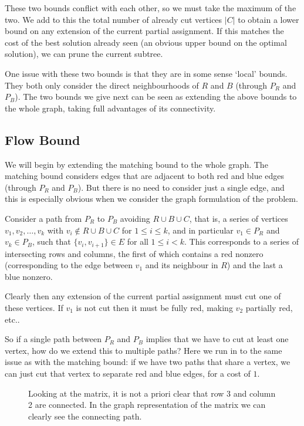 	These two bounds conflict with each other, so we must take the maximum of
	the two. We add to this the total number of already cut vertices $|C|$ to
	obtain a lower bound on any extension of the current partial assignment.
	If this matches the cost of the best solution already seen (an obvious
	upper bound on the optimal solution), we can prune the current subtree.

	One issue with these two bounds is that they are in some sense `local'
	bounds. They both only consider the direct neighbourhoods of $R$ and $B$
	(through $P_R$ and $P_B$). The two bounds we give next can be seen as
	extending the above bounds to the whole graph, taking full advantages of
	its connectivity.

	\subsection{Flow Bound}

	We will begin by extending the matching bound to the whole graph. The
	matching bound considers edges that are adjacent to both red and blue
	edges (through $P_R$ and $P_B$). But there is no need to consider just
	a single edge, and this is especially obvious when we consider the graph
	formulation of the problem.

	Consider a path from $P_R$ to $P_B$ avoiding $R \cup B \cup C$, that is,
	a series of vertices $v_1, v_2, \dots, v_k$ with
	$v_i \not\in R\cup B\cup C$ for $1 \leq i\leq k$,
	and in particular $v_1 \in P_R$ and $v_k \in P_B$,
	such that $\{v_i, v_{i+1}\} \in E$ for all $1 \leq i < k$. This
	corresponds to a series of intersecting rows and columns, the first of
	which contains a red nonzero (corresponding to the edge between $v_1$ and
	its neighbour in $R$) and the last a blue nonzero.

	Clearly then any extension of the current partial assignment must cut one
	of these vertices. If $v_1$ is not cut then it must be fully red, making
	$v_2$ partially red, etc..

	So if a single path between $P_R$ and $P_B$ implies that we have to cut at
	least one vertex, how do we extend this to multiple paths? Here we run in
	to the same issue as with the matching bound: if we have two paths that
	share a vertex, we can just cut that vertex to separate red and blue edges,
	for a cost of $1$.

	\begin{figure}[h]
		
		\centering
		\label{fig-flow}
		\caption{Looking at the matrix, it is not a priori clear that row 3
			and column 2 are connected. In the graph representation of the
			matrix we can clearly see the connecting path.}
	\end{figure}

